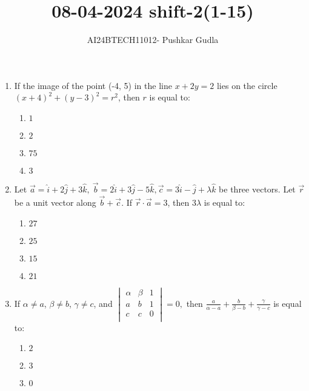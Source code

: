 \documentclass[journal,12pt,onecolumn]{IEEEtran}
\theoremstyle{remark}
\begin{document}

\vspace{3cm}

\title{\textbf{08-04-2024 shift-2(1-15)}}
\author{AI24BTECH11012- Pushkar Gudla}
\maketitle
\bigskip

\renewcommand{\thefigure}{\theenumi}
\renewcommand{\thetable}{\theenumi}
\setlength{\columnsep}{2.5em}
\begin{enumerate}
    \item If the image of the point (-4, 5) in the line $x + 2y = 2$ lies on the circle $(x + 4)^2 + (y - 3)^2 = r^2$, then $r$ is equal to:
    \begin{enumerate}
        \item $1$
        \item $2$
        \item $75$
        \item $3$
    \end{enumerate}
    \item Let $\overrightarrow{a} = \hat{i} + 2\hat{j} + 3\hat{k}, \ \overrightarrow{b} = 2\hat{i} + 3\hat{j} - 5\hat{k}, \overrightarrow{c} = 3\hat{i} - \hat{j} + \lambda\hat{k}$ be three vectors. Let $\overrightarrow{r}$ be a unit vector along $\overrightarrow{b} + \overrightarrow{c}$. If $\overrightarrow{r} \cdot \overrightarrow{a} = 3$, then $3\lambda$ is equal to:
    \begin{enumerate}
        \item $27$
        \item $25$
        \item $15$
        \item $21$
    \end{enumerate}
    \item If $\alpha \neq a$, $\beta \neq b$, $\gamma \neq c$, and
$
\begin{vmatrix}
\alpha & \beta & 1 \\
a & b & 1 \\
c & c & 0 \\
\end{vmatrix} = 0,
$
then $\frac{a}{\alpha-a}+\frac{b}{\beta-b}+\frac{\gamma}{\gamma-c}$ is equal to:
    \begin{enumerate}
        \item $2$
        \item $3$
        \item $0$

\end{enumerate}
\end{enumerate}
\end{document}
